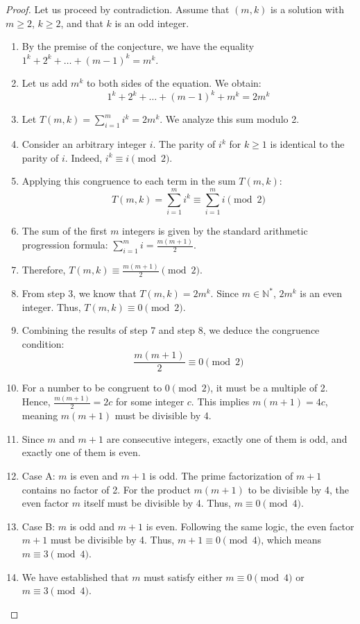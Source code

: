 \documentclass[11pt,a4paper]{article}
\begin{document}
\begin{proof}
Let us proceed by contradiction. Assume that $(m, k)$ is a solution with $m \ge 2$, $k \ge 2$, and that $k$ is an odd integer.
\begin{enumerate}
    \item By the premise of the conjecture, we have the equality $1^k + 2^k + \dots + (m-1)^k = m^k$.
    \item Let us add $m^k$ to both sides of the equation. We obtain:
    $$1^k + 2^k + \dots + (m-1)^k + m^k = 2m^k$$
    \item Let $T(m, k) = \sum_{i=1}^{m} i^k = 2m^k$. We analyze this sum modulo 2.
    \item Consider an arbitrary integer $i$. The parity of $i^k$ for $k \ge 1$ is identical to the parity of $i$. Indeed, $i^k \equiv i \pmod 2$.
    \item Applying this congruence to each term in the sum $T(m, k)$:
    $$T(m, k) = \sum_{i=1}^{m} i^k \equiv \sum_{i=1}^{m} i \pmod 2$$
    \item The sum of the first $m$ integers is given by the standard arithmetic progression formula: $\sum_{i=1}^{m} i = \frac{m(m+1)}{2}$.
    \item Therefore, $T(m, k) \equiv \frac{m(m+1)}{2} \pmod 2$.
    \item From step 3, we know that $T(m, k) = 2m^k$. Since $m \in \mathbb{N}^*$, $2m^k$ is an even integer. Thus, $T(m, k) \equiv 0 \pmod 2$.
    \item Combining the results of step 7 and step 8, we deduce the congruence condition:
    $$\frac{m(m+1)}{2} \equiv 0 \pmod 2$$
    \item For a number to be congruent to $0 \pmod 2$, it must be a multiple of 2. Hence, $\frac{m(m+1)}{2} = 2c$ for some integer $c$. This implies $m(m+1) = 4c$, meaning $m(m+1)$ must be divisible by 4.
    \item Since $m$ and $m+1$ are consecutive integers, exactly one of them is odd, and exactly one of them is even.
    \item Case A: $m$ is even and $m+1$ is odd. The prime factorization of $m+1$ contains no factor of 2. For the product $m(m+1)$ to be divisible by 4, the even factor $m$ itself must be divisible by 4. Thus, $m \equiv 0 \pmod 4$.
    \item Case B: $m$ is odd and $m+1$ is even. Following the same logic, the even factor $m+1$ must be divisible by 4. Thus, $m+1 \equiv 0 \pmod 4$, which means $m \equiv 3 \pmod 4$.
    \item We have established that $m$ must satisfy either $m \equiv 0 \pmod 4$ or $m \equiv 3 \pmod 4$.

\end{enumerate}
\end{proof}
\end{document}
